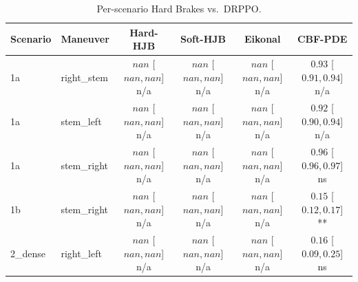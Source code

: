 \begin{table}[ht]
\centering
\caption{Per-scenario Hard Brakes vs.\ DRPPO.}
\label{tab:per_scenario_hard_brakes_per_ep_mean}
\begin{tabular}{llcccc}
\toprule
Scenario & Maneuver & Hard-HJB & Soft-HJB & Eikonal & CBF-PDE \\
\midrule
1a & right_stem & $nan$ [$nan, nan$] n/a & $nan$ [$nan, nan$] n/a & $nan$ [$nan, nan$] n/a & $0.93$ [$0.91, 0.94$] n/a \\
1a & stem_left & $nan$ [$nan, nan$] n/a & $nan$ [$nan, nan$] n/a & $nan$ [$nan, nan$] n/a & $0.92$ [$0.90, 0.94$] n/a \\
1a & stem_right & $nan$ [$nan, nan$] n/a & $nan$ [$nan, nan$] n/a & $nan$ [$nan, nan$] n/a & $0.96$ [$0.96, 0.97$] ns \\
1b & stem_right & $nan$ [$nan, nan$] n/a & $nan$ [$nan, nan$] n/a & $nan$ [$nan, nan$] n/a & $0.15$ [$0.12, 0.17$] ** \\
2_dense & right_left & $nan$ [$nan, nan$] n/a & $nan$ [$nan, nan$] n/a & $nan$ [$nan, nan$] n/a & $0.16$ [$0.09, 0.25$] ns \\
\bottomrule
\end{tabular}
\end{table}
